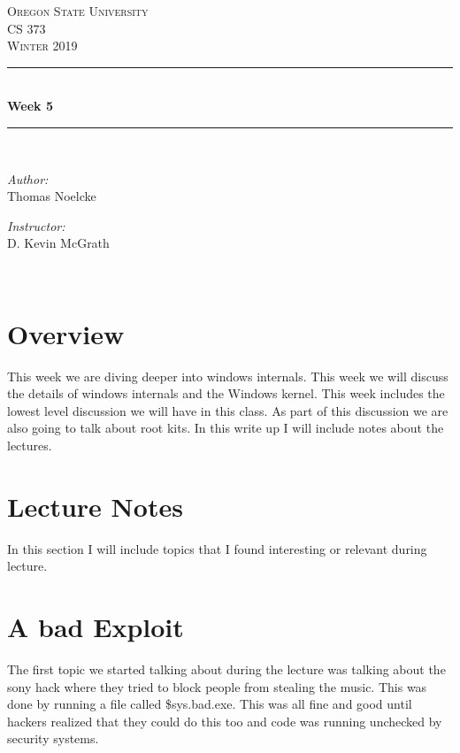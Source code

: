 \documentclass[letterpaper, onecolumn,10pt]{IEEEtran}
\begin{document}
    \begin{titlepage}
    \newcommand{\HRule}{\rule{\linewidth}{0.5mm}}
    \center
    \textsc{\Large Oregon State University}\\[1.5cm]
    \textsc{\Large CS 373}\\[0.5cm]
    \textsc{\Large Winter 2019}\\[0.5cm]
    \HRule \\[0.4cm]
    { \huge \bfseries Week 5}\\[0.4cm] %
    \HRule \\[1.5cm]
    \begin{minipage}{0.4\textwidth}
        \begin{flushleft} \large
        \emph{Author:}\\
        Thomas Noelcke
        \end{flushleft}
    \end{minipage}
    \begin{minipage}{0.4\textwidth}
        \begin{flushright} \large
        \emph{Instructor:} \\
        D. Kevin McGrath\\
        \end{flushright}
    \end{minipage}\\[2cm]
		\end{titlepage}
		
		
		\section{Overview}
		This week we are diving deeper into windows internals. This week we will discuss the details of windows internals and the Windows kernel. This week includes the lowest level discussion we will have in this class. As part of this discussion we are also going to talk about root kits. In this write up I will include notes about the lectures.\\
		
		\section{Lecture Notes}
		    In this section I will include topics that I found interesting or relevant during lecture.\\
		    
		    \section{A bad Exploit}
		    The first topic we started talking about during the lecture was talking about the sony hack where they tried to block people from stealing the music. This was done by running a file called \$sys.bad.exe. This was all fine and good until hackers realized that they could do this too and code was running unchecked by security systems.\\
		    
\end{document}
